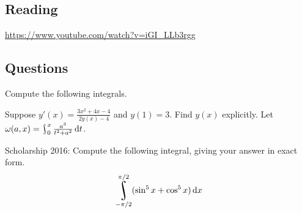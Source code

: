 


\subsection*{Reading}

\begin{center}
\begin{tcolorbox}[width=0.8\textwidth,colback={red},title={\textbf{Go and watch...}},colbacktitle=yellow,coltitle=blue]
  \textcolor{white}{\url{https://www.youtube.com/watch?v=iGI_LLb3rgg}}
\end{tcolorbox}
\end{center}

\subsection*{Questions}
\begin{questions}
  \question Compute the following integrals.
  \question Suppose $ y'(x) = \frac{3x^2 + 4x - 4}{2y(x) - 4} $ and $ y(1) = 3 $. Find $ y(x) $ explicitly.
  \question Let $ \omega(a, x) = \rint^x_0 \frac{a^3}{t^2 + a^2} \dif{t} $.
  \question Scholarship 2016: Compute the following integral, giving your answer in exact form.
    \begin{displaymath}
      \rint_{-\pi/2}^{\pi/2} (\sin^5 x + \cos^5 x) \dif{x}
    \end{displaymath}
\end{questions}


